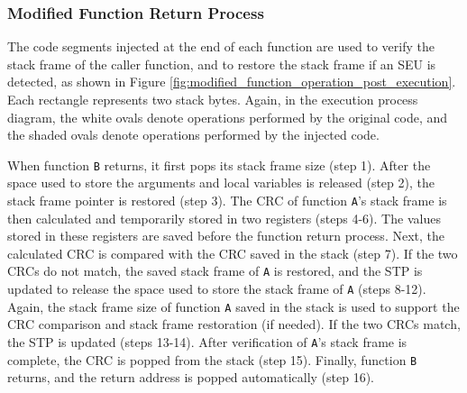 \subsubsection{Modified Function Return Process}

The code segments injected at the end of each function are used to verify the stack frame of the caller function, and to restore the stack frame if an SEU is detected, as shown in Figure \ref{fig:modified_function_operation_post_execution}. Each rectangle represents two stack bytes. Again, in the execution process diagram, the white ovals denote operations performed by the original code, and the shaded ovals denote operations performed by the injected code.

When function \texttt{B} returns, it first pops its stack frame size (step 1). After the space used to store the arguments and local variables is released (step 2), the stack frame pointer is restored (step 3). The CRC of function \texttt{A}'s stack frame is then calculated and temporarily stored in two registers (steps 4-6). The values stored in these registers are saved before the function return process. Next, the calculated CRC is compared with the CRC saved in the stack (step 7). If the two CRCs do not match, the saved stack frame of \texttt{A} is restored, and the STP is updated to release the space used to store the stack frame of \texttt{A} (steps 8-12). Again, the stack frame size of function \texttt{A} saved in the stack is used to support the CRC comparison and stack frame restoration (if needed). If the two CRCs match, the STP is updated (steps 13-14). After verification of \texttt{A}'s stack frame is complete, the CRC is popped from the stack (step 15). Finally, function \texttt{B} returns, and the return address is popped automatically (step 16).

